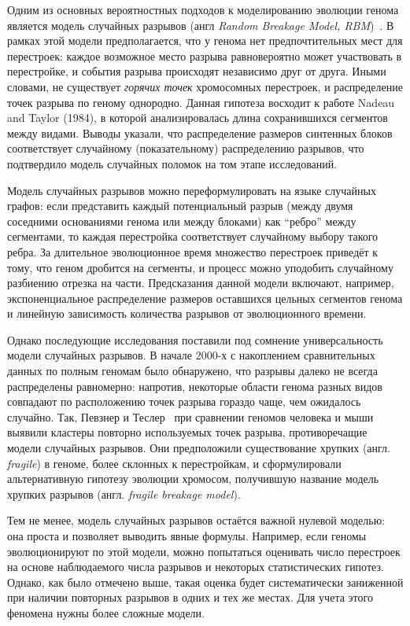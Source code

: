 Одним из основных вероятностных подходов к моделированию эволюции генома является модель случайных разрывов (англ \textit{Random Breakage Model, RBM})~\cite{Lin2008}.
В рамках этой модели предполагается, что у генома нет предпочтительных мест для перестроек: каждое возможное место разрыва равновероятно может участвовать в перестройке, и события разрыва происходят независимо друг от друга.
Иными словами, не существует \textit{горячих точек} хромосомных перестроек, и распределение точек разрыва по геному однородно.
Данная гипотеза восходит к работе Nadeau and Taylor (1984), в которой анализировалась длина сохранившихся сегментов между видами.
Выводы указали, что распределение размеров синтенных блоков соответствует случайному (показательному) распределению разрывов, что подтвердило модель случайных поломок на том этапе исследований.

Модель случайных разрывов можно переформулировать на языке случайных графов: если представить каждый потенциальный разрыв (между двумя соседними основаниями генома или между блоками) как ``ребро'' между сегментами, то каждая перестройка соответствует случайному выбору такого ребра.
За длительное эволюционное время множество перестроек приведёт к тому, что геном дробится на сегменты, и процесс можно уподобить случайному разбиению отрезка на части.
Предсказания данной модели включают, например, экспоненциальное распределение размеров оставшихся цельных сегментов генома и линейную зависимость количества разрывов от эволюционного времени.

Однако последующие исследования поставили под сомнение универсальность модели случайных разрывов.
В начале 2000-х с накоплением сравнительных данных по полным геномам было обнаружено, что разрывы далеко не всегда распределены равномерно: напротив, некоторые области генома разных видов совпадают по расположению точек разрыва гораздо чаще, чем ожидалось случайно.
Так, Певзнер и Теслер~\cite{Pevzner03} при сравнении геномов человека и мыши выявили кластеры повторно используемых точек разрыва, противоречащие модели случайных разрывов.
Они предположили существование хрупких (англ. \textit{fragile}) в геноме, более склонных к перестройкам, и сформулировали альтернативную гипотезу эволюции хромосом, получившую название модель хрупких разрывов (англ. \textit{fragile breakage model}).

Тем не менее, модель случайных разрывов остаётся важной нулевой моделью: она проста и позволяет выводить явные формулы.
Например, если геномы эволюционируют по этой модели, можно попытаться оценивать число перестроек на основе наблюдаемого числа разрывов и некоторых статистических гипотез.
Однако, как было отмечено выше, такая оценка будет систематически заниженной при наличии повторных разрывов в одних и тех же местах.
Для учета этого феномена нужны более сложные модели.

